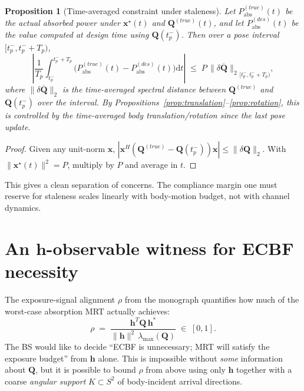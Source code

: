 \documentclass[11pt,a4paper]{article}
\newtheorem{proposition}[theorem]{Proposition}
\theoremstyle{definition}
\newcommand{\xx}{\mathbf{x}}
\newcommand{\hh}{\mathbf{h}}
\newcommand{\Q}{\mathbf{Q}}
\newcommand{\lammax}{\lambda_{\max}}
\newcommand{\diff}{\mathrm{d}}
\begin{document}
\begin{proposition}[Time-averaged constraint under staleness]
\label{prop:time-avg}
Let $P_{\mathrm{abs}}^{(true)}(t)$ be the actual absorbed power
under $\xx^\star(t)$ and $\Q^{(true)}(t)$, and let
$P_{\mathrm{abs}}^{(des)}(t)$ be the value computed at design time
using $\Q(t_p^-)$. Then over a pose interval $[t_p^-,t_p^-+T_p)$,
\[
  \left|\frac{1}{T_p}\int_{t_p^-}^{t_p^-+T_p}
        \!\!\bigl(P_{\mathrm{abs}}^{(true)}(t) - P_{\mathrm{abs}}^{(des)}(t)\bigr)\diff t\right|
  \;\le\; P\,\overline{\|\delta\Q\|_2}_{[t_p^-,t_p^-+T_p)},
\]
where $\overline{\|\delta\Q\|_2}$ is the time-averaged spectral
distance between $\Q^{(true)}$ and $\Q(t_p^-)$ over the interval.
By Propositions~\ref{prop:translation}--\ref{prop:rotation}, this is
controlled by the time-averaged body translation/rotation since the last
pose update.
\end{proposition}

\begin{proof}
Given any unit-norm $\xx$, $|\xx^H(\Q^{(true)}-\Q(t_p^-))\xx|\le
\|\delta\Q\|_2$. With $\|\xx^\star(t)\|^2=P$, multiply by $P$ and
average in $t$.
\end{proof}

This gives a clean separation of concerns. The compliance margin one
must reserve for staleness scales linearly with body-motion budget,
not with channel dynamics.

\section{An \texorpdfstring{$\hh$}{h}-observable witness for ECBF necessity}
\label{sec:rho-witness}

The exposure-signal alignment $\rho$ from the monograph quantifies how much
of the worst-case absorption MRT actually achieves:
\begin{equation}
  \rho \;=\; \frac{\hh^T \Q\,\hh^*}{\|\hh\|^2\,\lammax(\Q)} \;\in\; [0,1].
  \label{eq:rho-def-restate}
\end{equation}
The BS would like to decide ``ECBF is unnecessary; MRT will satisfy the
exposure budget'' from $\hh$ alone. This is impossible without
\emph{some} information about $\Q$, but it is possible to bound $\rho$
from above using only $\hh$ together with a coarse \emph{angular
support} $K\subset S^2$ of body-incident arrival directions.
\end{document}
